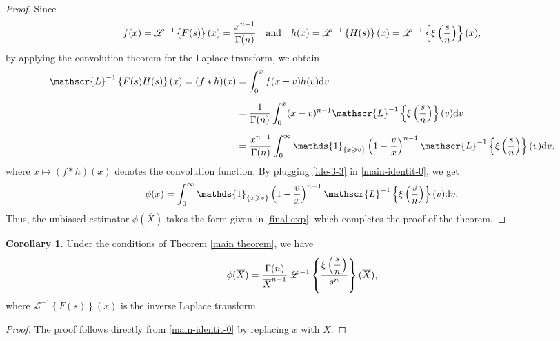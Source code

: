 \documentclass[12pt]{article}
\theoremstyle{definition}
\newtheorem{corollary}[theorem]{Corollary}
\begin{document}
\begin{proof}
	Since
	\begin{align*}
		f(x)=  \mathscr{L}^{-1}\left\{	F(s)
		\right\}(x)
		=
		{x^{n-1}\over\Gamma(n)}
		\quad
		\text{and}
		\quad 
		h(x)=\mathscr{L}^{-1}\left\{H(s)
		\right\}(x)
		=
		\mathscr{L}^{-1}\left\{\xi\left({s\over n}\right)
		\right\}(x),
	\end{align*}
	by applying the convolution theorem for the Laplace transform, we obtain
	\begin{align}
		\mathscr{L}^{-1}\left\{	
		F(s) H(s)
		\right\}
		(x)
		=
		(f*h)(x)
		&=
		\int_0^x f(x-v)h(v){\rm d}v
		\nonumber
		\\[0,2cm]
		&=
		{1\over\Gamma(n)}
		\int_0^x (x-v)^{n-1} 
		\mathscr{L}^{-1}\left\{\xi\left({s\over n}\right)
		\right\}(v){\rm d}v
		\label{ide-3-3-1}
		\\[0,2cm]
		&=
		{x^{n-1} \over\Gamma(n)}
		\int_0^\infty 
		\mathds{1}_{\{x\geqslant v\}}
		\left(1-{v\over x}\right)^{n-1} 
		\mathscr{L}^{-1}\left\{\xi\left({s\over n}\right)
		\right\}(v){\rm d}v, \label{ide-3-3}
	\end{align}
	where $x\mapsto(f*h)(x)$ denotes  the convolution function. By plugging \eqref{ide-3-3} in \eqref{main-identit-0}, we get
	\begin{align}
		\phi(x)
		=
		\int_0^\infty 
		\mathds{1}_{\{x\geqslant v\}}
		\left(1-{v\over x}\right)^{n-1} 
		\mathscr{L}^{-1}\left\{\xi\left({s\over n}\right)
		\right\}(v){\rm d}v.
	\end{align}
	Thus, the unbiased estimator $\phi(\overline{X})$ takes the form given in \eqref{final-exp}, which completes the proof of the theorem.
\end{proof}

\begin{corollary}\label{coro-main}
	Under the conditions of Theorem \ref{main theorem}, we have 
	\begin{align*}
		\phi(\overline{X})
		=
		{\Gamma(n)\over \overline{X}^{n-1}}\,
		\mathscr{L}^{-1}\left\{	
		{\displaystyle \xi\left({s\over n}\right)\over s^n}
		\right\}
		(\overline{X}),
	\end{align*}
	where $\mathscr{L}^{-1}\left\{F(s)\right\}(x)$ is the inverse Laplace  transform.
\end{corollary}
\begin{proof}
	The proof follows directly from \eqref{main-identit-0} by replacing $x$ with $\overline{X}$.
\end{proof}
\end{document}
